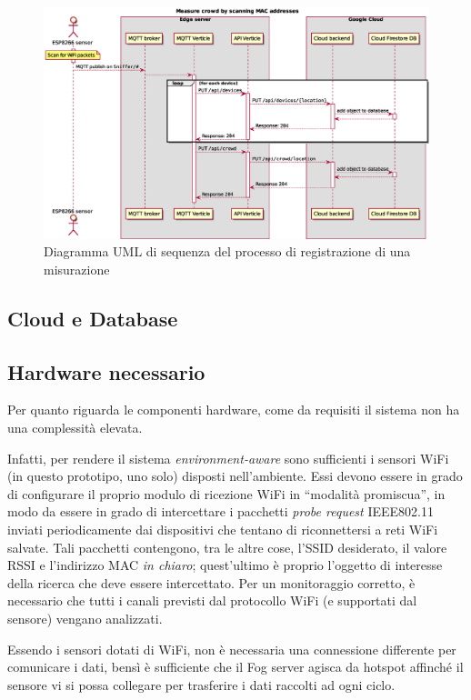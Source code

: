 \begin{figure}[H]
  \centering
  \includegraphics[width=\textwidth]{res/out/measure.eps}
  \caption{Diagramma UML di sequenza del processo di registrazione di una misurazione}%
  \label{fig:measure}
\end{figure}

\subsection{Cloud e Database}


\subsection{Hardware necessario}

Per quanto riguarda le componenti hardware, come da requisiti il sistema non ha una complessità elevata.

Infatti, per rendere il sistema \emph{environment-aware} sono sufficienti i sensori WiFi (in questo prototipo, uno solo) disposti nell'ambiente.
Essi devono essere in grado di configurare il proprio modulo di ricezione WiFi in ``modalità promiscua'',
in modo da essere in grado di intercettare i pacchetti \emph{probe request} IEEE802.11 inviati periodicamente dai dispositivi che tentano di riconnettersi a reti WiFi salvate.
Tali pacchetti contengono, tra le altre cose, l'SSID desiderato, il valore RSSI e l'indirizzo MAC \emph{in chiaro};
quest'ultimo è proprio l'oggetto di interesse della ricerca che deve essere intercettato.
Per un monitoraggio corretto, è necessario che tutti i canali previsti dal protocollo WiFi (e supportati dal sensore) vengano analizzati.

Essendo i sensori dotati di WiFi, non è necessaria una connessione differente per comunicare i dati,
bensì è sufficiente che il Fog server agisca da hotspot affinché il sensore vi si possa collegare per trasferire i dati raccolti ad ogni ciclo.
